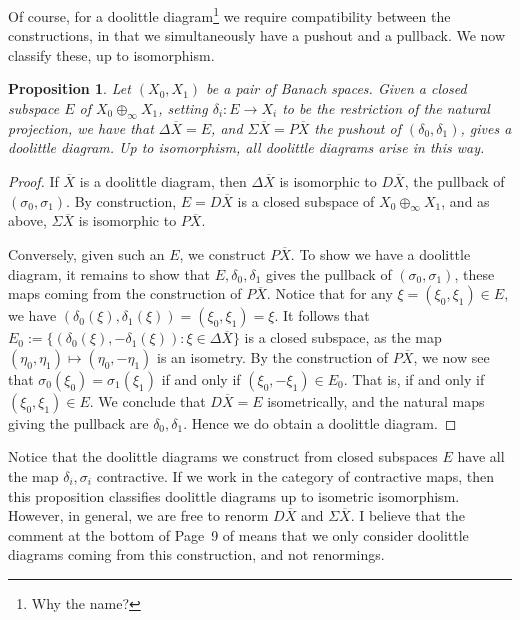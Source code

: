 \documentclass[a4paper,11pt]{article}
\theoremstyle{plain}
\newtheorem{proposition}{Proposition}[section]
\theoremstyle{remark}
\begin{document}
Of course, for a doolittle diagram\footnote{Why the name?} we require compatibility between the constructions, in that we simultaneously have a pushout and a pullback.  We now classify these, up to isomorphism.

\begin{proposition}
Let $(X_0, X_1)$ be a pair of Banach spaces.  Given a closed subspace $E$ of $X_0 \oplus_\infty X_1$, setting $\delta_i \colon E \to X_i$ to be the restriction of the natural projection, we have that $\Delta\overline X = E$, and $\Sigma\overline X = P\overline X$ the pushout of $(\delta_0,\delta_1)$, gives a doolittle diagram.  Up to isomorphism, all doolittle diagrams arise in this way.
\end{proposition}
\begin{proof}
If $\overline X$ is a doolittle diagram, then $\Delta\overline X$ is isomorphic to $D\overline X$, the pullback of $(\sigma_0, \sigma_1)$.  By construction, $E = D\overline X$ is a closed subspace of $X_0 \oplus_\infty X_1$, and as above, $\Sigma\overline X$ is isomorphic to $P\overline X$.

Conversely, given such an $E$, we construct $P\overline X$.  To show we have a doolittle diagram, it remains to show that $E, \delta_0, \delta_1$ gives the pullback of $(\sigma_0, \sigma_1)$, these maps coming from the construction of $P\overline X$.  Notice that for any $\xi = (\xi_0, \xi_1) \in E$, we have $(\delta_0(\xi), \delta_1(\xi)) = (\xi_0, \xi_1) = \xi$.  It follows that $E_0 := \{ (\delta_0(\xi), -\delta_1(\xi)) : \xi\in\Delta\overline X\}$ is a closed subspace, as the map $(\eta_0,\eta_1) \mapsto (\eta_0, -\eta_1)$ is an isometry.  By the construction of $P\overline X$, we now see that $\sigma_0(\xi_0) = \sigma_1(\xi_1)$ if and only if $(\xi_0, -\xi_1) \in E_0$.  That is, if and only if $(\xi_0,\xi_1) \in E$.  We conclude that $D\overline X = E$ isometrically, and the natural maps giving the pullback are $\delta_0,\delta_1$.  Hence we do obtain a doolittle diagram.
\end{proof}

Notice that the doolittle diagrams we construct from closed subspaces $E$ have all the map $\delta_i, \sigma_i$ contractive.
If we work in the category of contractive maps, then this proposition classifies doolittle diagrams up to isometric isomorphism.  However, in general, we are free to renorm $D\overline X$ and $\Sigma\overline X$.  I believe that the comment at the bottom of Page~9 of \cite{KP_InterpolationFunctorsDuality} means that we only consider doolittle diagrams coming from this construction, and not renormings.




\end{document}
